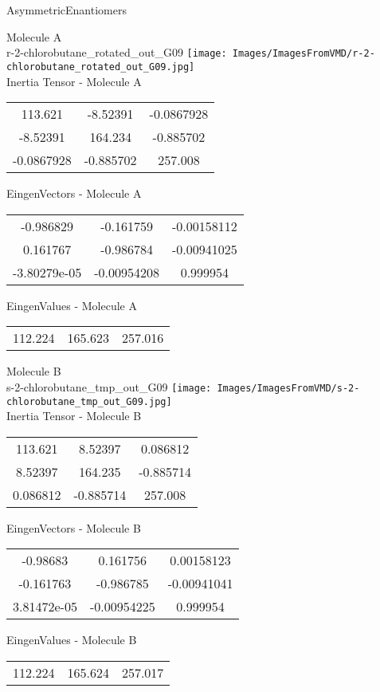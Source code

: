 \vtab[-2cm]
\begin{center}
{\large AsymmetricEnantiomers}
\end{center}
\begin{multicols}{2}
\begin{center}
Molecule A \\ 
r-2-chlorobutane\_rotated\_out\_G09
\texttt{[image: Images/ImagesFromVMD/r-2-chlorobutane\_rotated\_out\_G09.jpg]}
\\
Inertia Tensor - Molecule A \\
\vtab
\begin{tabular}{|c c c|}
113.621	 & 	-8.52391	 & 	-0.0867928	 \\
-8.52391	 & 	164.234	 & 	-0.885702	 \\
-0.0867928	 & 	-0.885702	 & 	257.008
\end{tabular}

\vtab
 EingenVectors - Molecule A     \\
\vtab
\begin{tabular}{|c c c|}
-0.986829	 & 	-0.161759	 & 	-0.00158112	 \\
0.161767	 & 	-0.986784	 & 	-0.00941025	 \\
-3.80279e-05	 & 	-0.00954208	 & 	0.999954
\end{tabular}

\vtab
 EingenValues - Molecule A     \\
\vtab
\begin{tabular}{|c c c|}
112.224	 & 	165.623	 & 	257.016
\end{tabular}
\columnbreak

Molecule B \\ 
s-2-chlorobutane\_tmp\_out\_G09
\texttt{[image: Images/ImagesFromVMD/s-2-chlorobutane\_tmp\_out\_G09.jpg]}
\\
Inertia Tensor - Molecule B \\
\vtab
\begin{tabular}{|c c c|}
113.621	 & 	8.52397	 & 	0.086812	 \\
8.52397	 & 	164.235	 & 	-0.885714	 \\
0.086812	 & 	-0.885714	 & 	257.008
\end{tabular}

\vtab
 EingenVectors - Molecule B     \\
\vtab
\begin{tabular}{|c c c|}
-0.98683	 & 	0.161756	 & 	0.00158123	 \\
-0.161763	 & 	-0.986785	 & 	-0.00941041	 \\
3.81472e-05	 & 	-0.00954225	 & 	0.999954
\end{tabular}

\vtab
 EingenValues - Molecule B     \\
\vtab
\begin{tabular}{|c c c|}
112.224	 & 	165.624	 & 	257.017
\end{tabular}

\end{center}
\end{multicols}
